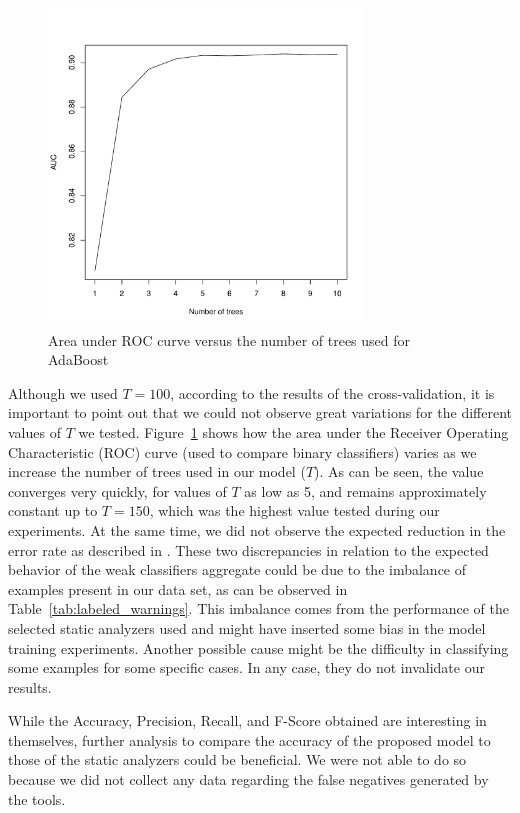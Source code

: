 \begin{figure}
\centering
\includegraphics[width=0.75\textwidth]{figures/roc.pdf}
  \caption{Area under ROC curve versus the number of trees used for AdaBoost}\label{fig:roc}
\end{figure}


Although we used $T=100$, according to the results of the cross-validation, it is
important to point out that we could not observe great variations for the
different values of $T$ we tested. Figure~\ref{fig:roc} shows how the area
under the Receiver Operating Characteristic (ROC) curve (used to compare binary
classifiers) varies as we increase the number of trees used in our model ($T$).
As can be seen, the value converges very quickly, for values of $T$ as low as 5, and remains
approximately constant up to $T = 150$, which was the highest value tested
during our experiments. At the same time, we did not observe the expected
reduction in the error rate as described in \cite{freund1999short}.
These two discrepancies in relation to the expected behavior of the weak classifiers aggregate 
could be due to the imbalance of examples present
in our data set, as can be observed in Table~\ref{tab:labeled_warnings}. This
imbalance comes from the performance of the selected static analyzers used and
might have inserted some bias in the model training experiments. Another possible
cause might be
the difficulty in classifying some examples for some specific cases. In
any case, they do not invalidate our results.

While the Accuracy, Precision, Recall, and F-Score obtained are interesting
in themselves, 
further analysis to compare the accuracy of the proposed
model to those of the static analyzers could be beneficial. We were not
able to do so because we did not collect any data
regarding the false negatives generated by the tools.

